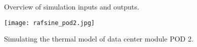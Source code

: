 \begin{figure}[!htb]
\centering
\begin{footnotesize} %
\def\svgwidth{1.0\linewidth}

\end{footnotesize}
\caption{Overview of simulation inputs and outputs.}
\label{fig:input_data}
\end{figure}

\begin{figure}[ht]
\begin{center}
\texttt{[image: rafsine\_pod2.jpg]}
\end{center}
\caption{Simulating the thermal model of data center module POD 2.}
\label{fig:pod2_thermal_flow}
\end{figure}
